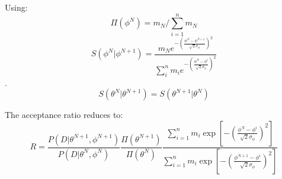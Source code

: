 \documentclass{article}
\begin{document}
Using:
$$\Pi(\phi^N) = m_N / \sum_{i=1}^n m_N$$
$$S(\phi^N | \phi^{N+1}) =\dfrac{ m_N   e^{  -\left(\tfrac{\phi^N - \phi^{N+1}}{\sqrt{2}\sigma_{\phi}}\right)^2     }}{\sum_i^{n} m_i e^{  -\left(\tfrac{\phi^N - \phi^{i}}{\sqrt{2}\sigma_{\phi}}\right)^2}}$$.
$$S(\theta^N | \theta^{N+1}) = S(\theta^{N+1} | \theta^{N})$$ 

The acceptance ratio reduces to:
\[
\boxed{
R= \dfrac{P(D | \theta^{N+1},\phi^{N+1})}{P(D | \theta^{N},\phi^{N})}   \dfrac{\Pi(\theta^{N+1})}{ \Pi(\theta^{N})} \dfrac{\sum_{i=1}^{n} m_i \exp \left[  -\left(\tfrac{\phi^N - \phi^{i}}{\sqrt{2}\sigma_{\phi}}\right)^2 \right] } {\sum_{i=1}^{n} m_i \exp \left[  -\left(\tfrac{\phi^{N+1} - \phi^i}{\sqrt{2}\sigma_{\phi}}\right)^2 \right]}
}
\]
\end{document}
